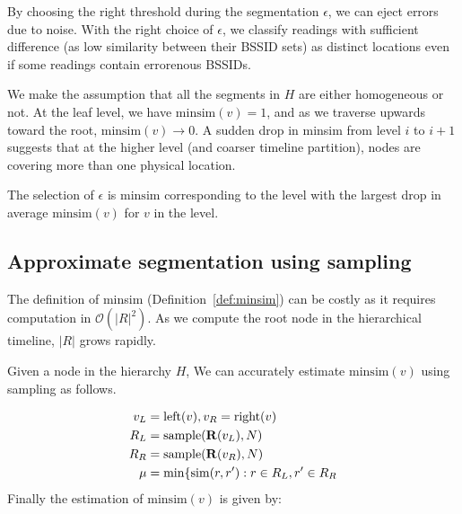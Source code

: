 By choosing the right threshold during the segmentation $\epsilon$, we can eject
errors due to noise.  With the right choice of
$\epsilon$, we classify readings with sufficient difference (as low similarity
between their BSSID sets) as distinct locations even if some readings contain
errorenous BSSIDs.

We make the assumption that all the segments in $H$ are either homogeneous or
not.  At the leaf level, we have $\mathrm{minsim}(v) = 1$, and as we traverse
upwards toward the root, $\mathrm{minsim}(v)\to 0$.  A sudden drop in minsim
from level $i$ to $i+1$ suggests that at the higher level (and coarser timeline
partition), nodes are covering more than one physical location.

The selection of $\epsilon$ is $\mathrm{minsim}$ corresponding to the level with
the largest drop in average $\mathrm{minsim}(v)$ for $v$ in the level.

\subsection{Approximate segmentation using sampling}

The definition of minsim (Definition~\ref{def:minsim}) can be costly as it
requires computation in $\mathcal{O}(|R|^2)$.  As we compute the root node in
the hierarchical timeline, $|R|$ grows rapidly.

Given a node in the hierarchy $H$, We can accurately estimate
$\mathrm{minsim}(v)$ using sampling as follows.

\begin{align*}
v_L &= \mathrm{left}(v), v_R = \mathrm{right}(v)\\
R_L &= \mathrm{sample}(\mathbf{R}(v_L), N)\\
R_R &= \mathrm{sample}(\mathbf{R}(v_R), N)\\
\mu &= \mathrm{min}\{\mathrm{sim}(r,r'): r\in R_L, r'\in R_R
\end{align*}
Finally the estimation of $\mathrm{minsim}(v)$ is given by:

